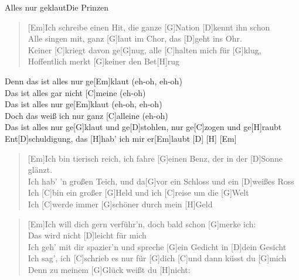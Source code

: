 \begin{song}{Alles nur geklaut}{Die Prinzen}

    \begin{verse}  
        [Em]Ich schreibe einen Hit, die ganze [G]Nation [D]kennt ihn schon \\
        [Em]Alle singen mit, ganz [G]laut im Chor, das [D]geht ins Ohr. \\
        Keiner [C]kriegt davon ge[G]nug, alle [C]halten mich für [G]klug, \\
        [C]Hoffentlich merkt [G]keiner den Bet[H]rug
    \end{verse}  

    \begin{chorus}
        Denn das ist alles nur ge[Em]klaut (eh-oh, eh-oh) \\
        Das ist alles gar nicht [C]meine (eh-oh) \\
        Das ist alles nur ge[Em]klaut (eh-oh, eh-oh) \\
        Doch das weiß ich nur ganz [C]alleine (eh-oh) \\
        Das ist alles nur ge[G]klaut und ge[D]stohlen, nur ge[C]zogen und ge[H]raubt \\
        Ent[D]schuldigung, das [H]hab' ich mir er[Em]laubt [D] \hspace{1em} [H] \hspace{1em} [Em]
    \end{chorus}

    \begin{verse}  
        [Em]Ich bin tierisch reich, ich fahre [G]einen Benz, 
        der in der [D]Sonne glänzt. \\
        [Em] Ich hab' 'n großen Teich, und da[G]vor ein Schloss und ein [D]weißes Ross \\
        Ich [C]bin ein großer [G]Held und ich [C]reise um die [G]Welt \\
        Ich [C]werde immer [G]schöner durch mein [H]Geld
    \end{verse}  


    \begin{verse}  
        [Em]Ich will dich gern verführ'n, doch bald schon [G]merke ich: \\
        Das wird nicht [D]leicht für mich \\
        [Em]Ich geh' mit dir spazier'n und spreche [G]ein Gedicht in [D]dein Gesicht \\
        Ich sag', ich [C]schrieb es nur für [G]dich [C]und dann küsst du [G]mich \\
        [C]Denn zu meinem [G]Glück weißt du [H]nicht:
    \end{verse}  


\end{song}
